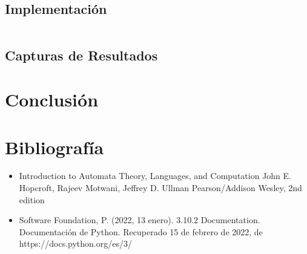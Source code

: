 \documentclass{article}
\begin{document}
\subsection{Implementaci\'on}
\begin{lstlisting}
\end{lstlisting}

\subsection{Capturas de Resultados}

\section{Conclusi\'on}

\section{Bibliograf\'ia}
\begin{itemize}
    \item Introduction to Automata Theory, Languages, and Computation
    John E. Hopcroft, Rajeev Motwani, Jeffrey D. Ullman
    Pearson/Addison Wesley, 2nd edition
    \item Software Foundation, P. (2022, 13 enero). 3.10.2 Documentation. Documentación de Python. Recuperado 15 de febrero de 2022, de https://docs.python.org/es/3/
\end{itemize}
\end{document}
